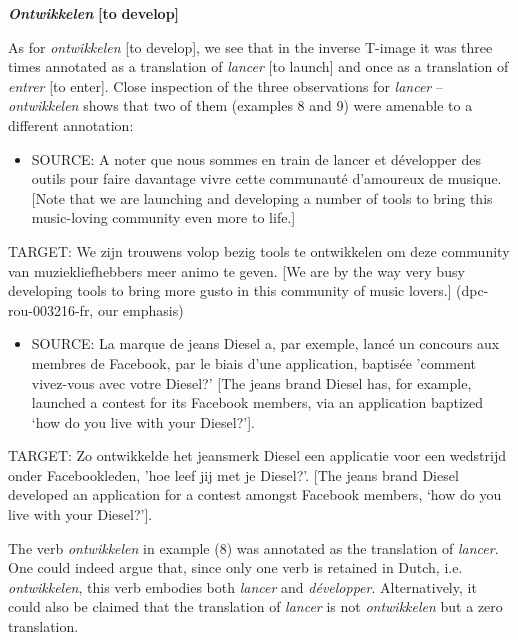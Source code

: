 \textbf{\textit{Ontwikkelen}} \textbf{[to} \textbf{develop]}

As for \textit{ontwikkelen} [to develop], we see that in the inverse T-image it was three times annotated as a translation of \textit{lancer} [to launch] and once as a translation of \textit{entrer} [to enter]. Close inspection of the three observations for \textit{lancer} –\textit{ontwikkelen} shows that two of them (examples 8 and 9) were amenable to a different annotation:

\begin{itemize}
\item \begin{styleVoorbeeld}
SOURCE: A noter que nous sommes en train de lancer et développer des outils pour faire davantage vivre cette communauté d'amoureux de musique. [Note that we are launching and developing a number of tools to bring this music-loving community even more to life.]
\end{styleVoorbeeld}\end{itemize}
\begin{styleVoorbeeld}
TARGET: We zijn trouwens volop bezig tools te ontwikkelen om deze community van muziekliefhebbers meer animo te geven. [We are by the way very busy developing tools to bring more gusto in this community of music lovers.] (dpc-rou-003216-fr, our emphasis)
\end{styleVoorbeeld}

\begin{itemize}
\item \begin{styleVoorbeeld}
SOURCE: La marque de jeans Diesel a, par exemple, lancé un concours aux membres de Facebook, par le biais d'une application, baptisée 'comment vivez-vous avec votre Diesel?' [The jeans brand Diesel has, for example, launched a contest for its Facebook members, via an application baptized ‘how do you live with your Diesel?'].
\end{styleVoorbeeld}\end{itemize}
\begin{styleVoorbeeld}
TARGET: Zo ontwikkelde het jeansmerk Diesel een applicatie voor een wedstrijd onder Facebookleden, 'hoe leef jij met je Diesel?'. [The jeans brand Diesel developed an application for a contest amongst Facebook members, ‘how do you live with your Diesel?’].
\end{styleVoorbeeld}


The verb \textit{ontwikkelen} in example (8) was annotated as the translation of \textit{lancer}. One could indeed argue that, since only one verb is retained in Dutch, i.e. \textit{ontwikkelen}, this verb embodies both \textit{lancer} and \textit{développer}. Alternatively, it could also be claimed that the translation of \textit{lancer} is not \textit{ontwikkelen} but a zero translation.

